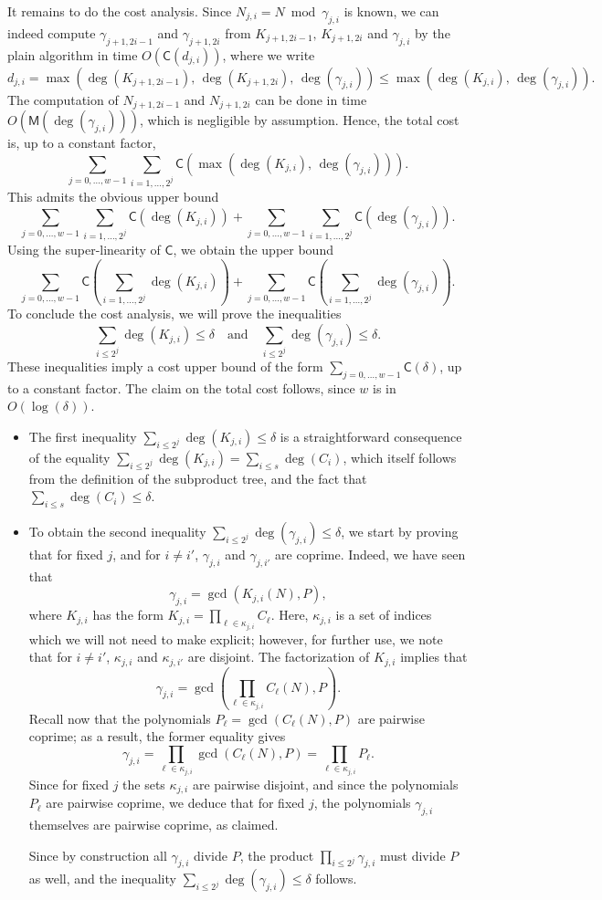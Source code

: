\documentclass[12pt]{article}
\def\CC {\ensuremath{\mathsf{C}}}
\def\M {\ensuremath{\mathsf{M}}}
\begin{document}
It remains to do the cost analysis. Since $N_{j,i}=N \bmod
\gamma_{j,i}$ is known, we can indeed compute $\gamma_{j+1,2i-1}$ and
$\gamma_{j+1,2i}$ from $K_{j+1,2i-1},\,K_{j+1,2i}$ and $\gamma_{j,i}$
by the plain algorithm in time $O(\CC(d_{j,i}))$, where we write
$$d_{j,i}=\max(\deg(K_{j+1,2i-1}),\,
\deg(K_{j+1,2i}),\,\deg(\gamma_{j,i})) \le \max
(\deg(K_{j,i}),\,\deg(\gamma_{j,i})).$$ The computation of
$N_{j+1,2i-1}$ and $N_{j+1,2i}$ can be done in time
$O(\M(\deg(\gamma_{j,i})))$, which is negligible by assumption.
Hence, the total cost is, up to a constant factor,
$$\sum_{j=0,\dots,w-1} \sum_{i=1,\dots,2^j} 
\CC(\max(\deg(K_{j,i}),\,\deg(\gamma_{j,i}))).$$ This admits the
obvious upper bound
$$\sum_{j=0,\dots,w-1} \sum_{i=1,\dots,2^j} \CC(\deg(K_{j,i})) +
\sum_{j=0,\dots,w-1} \sum_{i=1,\dots,2^j} \CC(\deg(\gamma_{j,i})).$$
Using the super-linearity of $\CC$, we obtain the upper bound
$$\sum_{j=0,\dots,w-1}\CC\left( \sum_{i=1,\dots,2^j} 
  \deg(K_{j,i}) \right ) + \sum_{j=0,\dots,w-1}\CC\left(
  \sum_{i=1,\dots,2^j} \deg(\gamma_{j,i})\right).$$ To conclude the
cost analysis, we will prove the inequalities
$$\sum_{i \le 2^j} \deg(K_{j,i}) \le \delta
\quad\text{and}\quad\sum_{i \le 2^j} \deg(\gamma_{j,i})\le \delta.$$
These inequalities imply a cost upper bound of the form
$\sum_{j=0,\dots,w-1}\CC(\delta)$, up to a constant factor. The claim
on the total cost follows, since $w$ is in $O(\log(\delta))$.
\begin{itemize}
\item The first inequality $\sum_{i \le 2^j} \deg(K_{j,i})\le \delta$
  is a straightforward consequence of the equality $\sum_{i \le 2^j}
  \deg(K_{j,i}) = \sum_{i \le s} \deg(C_i)$, which itself follows from
  the definition of the subproduct tree, and the fact that $\sum_{i
    \le s} \deg(C_i) \le \delta$.
\item To obtain the second inequality $\sum_{i \le 2^j}
  \deg(\gamma_{j,i})\le \delta$, we start by proving that for fixed
  $j$, and for $i \ne i'$, $\gamma_{j,i}$ and $\gamma_{j,i'}$ are
  coprime. Indeed, we have seen that
  $$\gamma_{j,i}=\gcd(K_{j,i}(N), P),$$ where $K_{j,i}$ has the form
  $K_{j,i}=\prod_{\ell \in \kappa_{j,i}} C_\ell$. Here, $\kappa_{j,i}$
  is a set of indices which we will not need to make explicit;
  however, for further use, we note that for $i \ne i'$,
  $\kappa_{j,i}$ and $\kappa_{j,i'}$ are disjoint. The factorization
  of $K_{j,i}$ implies that
  $$\gamma_{j,i}=\gcd(\prod_{\ell \in \kappa_{j,i}} C_\ell(N), P).$$
  Recall now that the polynomials $P_\ell=\gcd(C_\ell(N),P)$ are
  pairwise coprime; as a result, the former equality gives
  $$\gamma_{j,i}=\prod_{\ell \in \kappa_{j,i}} \gcd(C_\ell(N), P)=
  \prod_{\ell \in \kappa_{j,i}} P_\ell.$$ Since for fixed $j$ the sets
  $\kappa_{j,i}$ are pairwise disjoint, and since the polynomials
  $P_\ell$ are pairwise coprime, we deduce that for fixed $j$, the
  polynomials $\gamma_{j,i}$ themselves are pairwise coprime, as
  claimed.

  Since by construction all $\gamma_{j,i}$ divide $P$, the product
  $\prod_{i \le 2^j} \gamma_{j,i}$ must divide $P$ as well, and the
  inequality $\sum_{i \le 2^j} \deg(\gamma_{j,i}) \le \delta$ follows.
\end{itemize}
\end{document}
